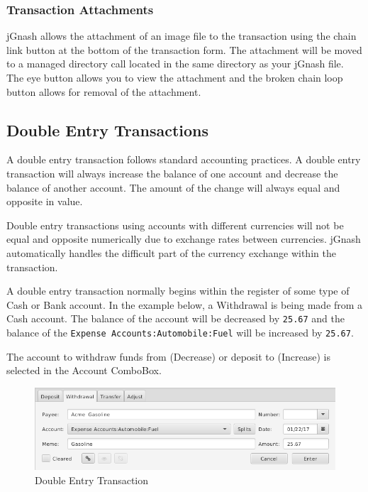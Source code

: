 \documentclass[letterpaper,12pt]{book}
\begin{document}
    \subsubsection*{Transaction Attachments}
    jGnash allows the attachment of an image file to the transaction using the chain link button at the bottom of the
    transaction form. The attachment will be moved to a managed directory call  located in the
    same directory as your jGnash file. The eye button allows you to view the attachment and the broken chain loop
    button allows for removal of the attachment.

    \subsection{Double Entry Transactions}
    A double entry transaction follows standard accounting practices. A double entry transaction will always
    increase the balance of one account and decrease the balance of another account. The amount of the change will
    always equal and opposite in value.

    \begin{mdframed}[style=info]
        Double entry transactions using accounts with different currencies will not be equal and opposite numerically due
        to exchange rates between currencies. jGnash automatically handles the difficult part of the currency exchange
        within the transaction.
    \end{mdframed}

    A double entry transaction normally begins within the register of some type of Cash or Bank account.
    In the example below, a Withdrawal is being made from a Cash account. The balance of the account will be decreased
    by \texttt{25.67} and the balance of the \texttt{Expense Accounts:Automobile:Fuel} will be increased by \texttt{25.67}.

    The account to withdraw funds from (Decrease) or deposit to (Increase) is selected in the Account ComboBox.

    \begin{figure}[H]
        \caption{Double Entry Transaction}
        \includegraphics[width=0.9\linewidth]{images/basicDoubleEntry}
    \end{figure}
\end{document}
